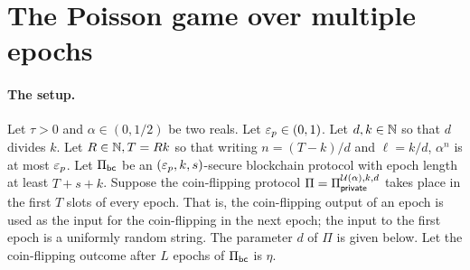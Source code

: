 




































\section{The Poisson game over multiple epochs}




\paragraph{The setup.} 
Let $\tau > 0$ and $\alpha \in (0, 1/2)$ be two reals. 
Let $\mathsf{\varepsilon}_p \in (0, 1)$. 
Let $d, k \in \mathbb{N}$ 
so that $d$ divides $k$. 
Let $R \in \mathbb{N}, T = Rk$ so that 
writing $n = (T - k)/d$ and $\ell = k/d$, 
$\alpha^n$ is at most $\mathsf{\varepsilon}_p$. 
Let $\Pi_\mathsf{bc}$ be an $(\mathsf{\varepsilon}_p, k, s)$-secure blockchain protocol 
with epoch length at least $T + s + k$. 
Suppose the	coin-flipping protocol $\Pi = \Pi_\mathsf{private}^{\mathcal{U}(\alpha),k,d}$ 
takes place in the first $T$ slots of every epoch. 
That is, the coin-flipping output of an epoch is used 
as the input for the coin-flipping in the next epoch; 
the input to the first epoch is a uniformly random string. 
The parameter $d$ of $\Pi$ is given below.
Let the coin-flipping outcome after $L$ epochs of $\Pi_\mathsf{bc}$ is $\eta$.

